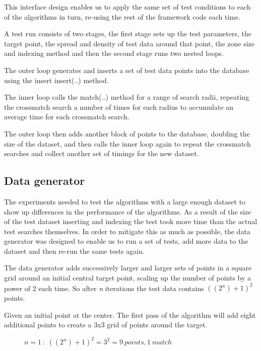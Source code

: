\documentclass{article}
\newcommand{\crossmatch} {crossmatch\xspace}
\newcommand{\dataset} {dataset\xspace}
\newcommand{\javaname}[1] {{\ttfamily\color{codeblue} #1}}
\begin{document}
This interface design enables us to apply the same set of test conditions to each of the algorithms in turn, re-using the rest of the framework code each time.

A test run consists of two stages, the first stage sets up the test parameters, the target point, the spread and density of test data around that point, the zone size and indexing method and then the second stage runs two nested loops.

The outer loop generates and inserts a set of test data points into the database using the insert \javaname{insert(..)} method.

The inner loop calls the \javaname{match(..)} method for a range of search radii, repeating the \crossmatch search a number of times for each radius to accumulate an average time for each \crossmatch search.

The outer loop then adds another block of points to the database, doubling the size of the \dataset, and then calls the inner loop again to repeat the \crossmatch searches and collect another set of timings for the new \dataset.

\subsection{Data generator}
\label{test-data-generator}

The experiments needed to test the algorithms with a large enough \dataset to show up differences in the performance of the algorithms.
As a result of the size of the test \dataset inserting and indexing the test took more time than the actual test searches themselves.
In order to mitigate this as much as possible, the data generator was designed to enable us to run a set of tests, add more data to the \dataset and then re-run the same tests again.

The data generator adds successively larger and larger sets of points in a square grid around an initial central target point, scaling up the number of points by a power of 2 each time.
So after \textit{n} iterations the test data contains \(((2^n)+1)^2\) points.

Given an initial point at the center. The first pass of the algorithm will add eight additional points to create a 3x3 grid of points around the target. 
\begin{figure}[h]

\caption{$n=1 \ :\ ((2^n)+1)^2 = 3^2 = 9 \ points, 1 \ match$}
\label{fig:data-count-03}
\end{figure}
\end{document}
